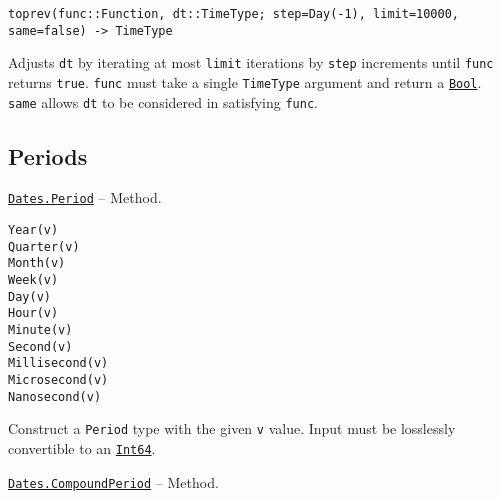 \begin{adjustwidth}{2em}{0pt}


\begin{verbatim}
toprev(func::Function, dt::TimeType; step=Day(-1), limit=10000, same=false) -> TimeType
\end{verbatim}

Adjusts \texttt{dt} by iterating at most \texttt{limit} iterations by \texttt{step} increments until \texttt{func} returns \texttt{true}. \texttt{func} must take a single \texttt{TimeType} argument and return a \hyperlink{46725311238864537}{\texttt{Bool}}. \texttt{same} allows \texttt{dt} to be considered in satisfying \texttt{func}.



\end{adjustwidth}

\hypertarget{5161625535326415321}{}


\subsection{Periods}


\hypertarget{5339072836021258931}{}
\hyperlink{5339072836021258931}{\texttt{Dates.Period}}  -- {Method.}

\begin{adjustwidth}{2em}{0pt}


\begin{verbatim}
Year(v)
Quarter(v)
Month(v)
Week(v)
Day(v)
Hour(v)
Minute(v)
Second(v)
Millisecond(v)
Microsecond(v)
Nanosecond(v)
\end{verbatim}

Construct a \texttt{Period} type with the given \texttt{v} value. Input must be losslessly convertible to an \hyperlink{7720564657383125058}{\texttt{Int64}}.



\end{adjustwidth}
\hypertarget{17112622972000489079}{}
\hyperlink{17112622972000489079}{\texttt{Dates.CompoundPeriod}}  -- {Method.}

